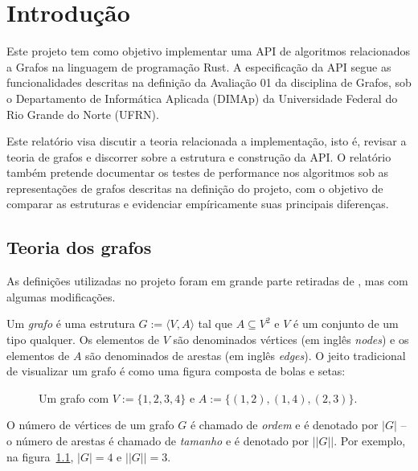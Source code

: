 \chapter{Introdução}
\label{ch:intro}

Este projeto tem como objetivo implementar uma API de
algoritmos relacionados a Grafos na linguagem de programação Rust. A
especificação da API segue as funcionalidades descritas na
definição da Avaliação 01 da disciplina de Grafos, sob o Departamento
de Informática Aplicada (DIMAp) da Universidade Federal do Rio Grande
do Norte (UFRN).

Este relatório visa discutir a teoria relacionada a implementação,
isto é, revisar a teoria de grafos e discorrer sobre a estrutura e
construção da API. O relatório também pretende documentar
os testes de performance  nos algoritmos sob as representações de
grafos descritas na definição do projeto, com o objetivo de comparar
as estruturas e evidenciar empíricamente suas principais diferenças.

\section{Teoria dos grafos}
\label{sec:defs}

As definições utilizadas no projeto foram em grande parte retiradas
de \cite{diestel2025graph}, mas com algumas modificações.

\begin{mydef}[Grafo]
  Um \emph{grafo} é uma estrutura $G := \langle V, A \rangle$
  tal que $A \subseteq V^2$ e $V$ é um conjunto de um tipo qualquer.
  Os elementos de $V$ são denominados vértices (em inglês
  \textit{nodes}) e os elementos de $A$ são denominados de arestas
  (em inglês \textit{edges}). O jeito tradicional de visualizar um
  grafo é como uma figura composta de bolas e setas:
  \begin{figure}[h]
    \centering
    \caption{Um grafo com $V := \{1,2,3,4\}$ e $A :=
    \{(1,2),(1,4),(2,3)\}.$}
    \label{fig:graph1}
  \end{figure}
\end{mydef}

\begin{mydef}
  O número de vértices de um grafo $G$ é chamado de \emph{ordem} e é
  denotado por $|G|$ -- o número de arestas é chamado de
  \emph{tamanho} e é denotado por $||G||$. Por exemplo, na
  figura~\ref{fig:graph1}, $|G| = 4$ e $||G|| = 3$.
\end{mydef}


